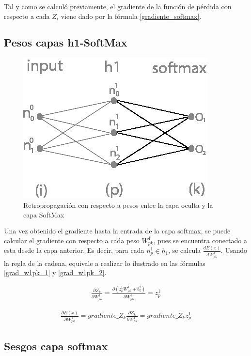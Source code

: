 Tal y como se calculó previamente, el gradiente de la función de pérdida con respecto a cada $Z_i$ viene dado por la fórmula \ref{gradiente_softmax}.


\subsection{Pesos capas h1-SoftMax}

\begin{figure}[H]
	\centering
	\includegraphics[scale=0.35]{imagenes/nn_1_capa_pesos_h1_output.jpg}  
	\caption{Retropropagación con respecto a pesos entre la capa oculta y la capa SoftMax}
	\label{fig:nn_1_pesos_h1_output}
\end{figure}

Una vez obtenido el gradiente hasta la entrada de la capa softmax, se puede calcular el gradiente con respecto a cada peso $W^1_{pk}$, pues se encuentra conectado a esta desde la capa anterior. Es decir, para cada $n^1_p\in h_1$, se calcula $\frac{dE(x)}{dW^1_{pk}}$. Usando la regla de la cadena, equivale a realizar lo ilustrado en las fórmulas \ref{grad_w1pk_1} y \ref{grad_w1pk_2}.

\begin{gather}
	\frac{\partial Z_k}{\partial W^1_{pk}} = \frac{\partial (z^1_p   W^1 _{pk}+ b^2_k)}{\partial W^1_{pk }} = z^1_p
	\label{grad_w1pk_1}
\end{gather}

\begin{gather}
	\frac{\partial E(x)}{\partial W^1_{pk }} =  gradiente\_Z_k   \frac{\partial Z_k}{\partial W^1_{pk }} = gradiente\_Z_k   z^1_p
	\label{grad_w1pk_2}
\end{gather}

\subsection{Sesgos capa softmax}

